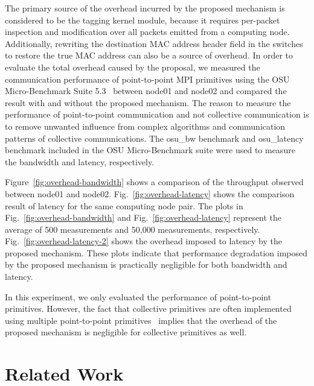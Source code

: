 The primary source of the overhead incurred by the proposed mechanism is
considered to be the tagging kernel module, because it requires
per-packet inspection and modification over all packets emitted from a
computing node. Additionally, rewriting the destination MAC address
header field in the switches to restore the true MAC address can also be
a source of overhead. In order to evaluate the total overhead caused by
the proposal, we measured the communication performance of
point-to-point MPI primitives using the OSU Micro-Benchmark Suite
5.3~\autocite{OhioStateUniversity2016} between node01 and node02 and
compared the result with and without the proposed mechanism. The reason
to measure the performance of point-to-point communication and not
collective communication is to remove unwanted influence from complex
algorithms and communication patterns of collective communications. The
osu\_bw benchmark and osu\_latency benchmark included in the OSU
Micro-Benchmark suite were used to measure the bandwidth and latency,
respectively.

Figure~\ref{fig:overhead-bandwidth} shows a comparison of the throughput
observed between node01 and node02. Fig.~\ref{fig:overhead-latency}
shows the comparison result of latency for the same computing node pair.
The plots in Fig.~\ref{fig:overhead-bandwidth} and
Fig.~\ref{fig:overhead-latency} represent the average of 500
measurements and 50,000 measurements, respectively.
Fig.~\ref{fig:overhead-latency-2} shows the overhead imposed to latency
by the proposed mechanism. These plots indicate that performance
degradation imposed by the proposed mechanism is practically negligible
for both bandwidth and latency.

In this experiment, we only evaluated the performance of point-to-point
primitives. However, the fact that collective primitives are often
implemented using multiple point-to-point
primitives~\autocites{Squyres2005}{Huang2006} implies that the overhead
of the proposed mechanism is negligible for collective primitives as
well.

\hypertarget{related-work}{%
\section{Related Work}\label{related-work}}

